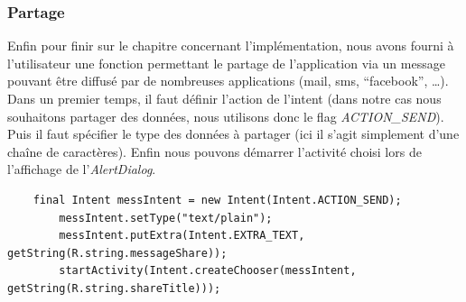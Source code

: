 \subsubsection{Partage}
Enfin pour finir sur le chapitre concernant l'implémentation, nous avons fourni
à l'utilisateur une fonction permettant le partage de l'application via un
message pouvant être diffusé par de nombreuses applications (mail, sms,
``facebook'', \ldots).
Dans un premier temps, il faut définir l'action de l'intent (dans notre cas
nous souhaitons partager des données, nous utilisons donc le flag
\textit{ACTION\_SEND}). Puis il faut spécifier le type des données à partager
(ici il s'agit simplement d'une chaîne de caractères).
Enfin nous pouvons démarrer l'activité choisi lors de l'affichage de
l'\textit{AlertDialog}.
\begin{lstlisting}
    final Intent messIntent = new Intent(Intent.ACTION_SEND);
	    messIntent.setType("text/plain");
	    messIntent.putExtra(Intent.EXTRA_TEXT, getString(R.string.messageShare));
	    startActivity(Intent.createChooser(messIntent, getString(R.string.shareTitle)));
\end{lstlisting}

